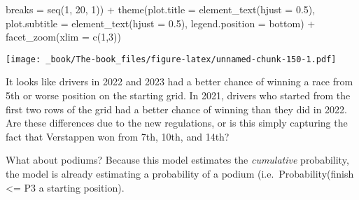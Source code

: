 \documentclass[
]{book}
\newenvironment{Shaded}{\begin{snugshade}}{\end{snugshade}}
\newcommand{\AttributeTok}[1]{\textcolor[rgb]{0.77,0.63,0.00}{#1}}
\newcommand{\DecValTok}[1]{\textcolor[rgb]{0.00,0.00,0.81}{#1}}
\newcommand{\FloatTok}[1]{\textcolor[rgb]{0.00,0.00,0.81}{#1}}
\newcommand{\FunctionTok}[1]{\textcolor[rgb]{0.00,0.00,0.00}{#1}}
\newcommand{\NormalTok}[1]{#1}
\newcommand{\SpecialCharTok}[1]{\textcolor[rgb]{0.00,0.00,0.00}{#1}}
\newcommand{\StringTok}[1]{\textcolor[rgb]{0.31,0.60,0.02}{#1}}
\begin{document}
\begin{Shaded}
\begin{Highlighting}[]
                     \AttributeTok{breaks =} \FunctionTok{seq}\NormalTok{(}\DecValTok{1}\NormalTok{, }\DecValTok{20}\NormalTok{, }\DecValTok{1}\NormalTok{)) }\SpecialCharTok{+}
  \FunctionTok{theme}\NormalTok{(}\AttributeTok{plot.title =} \FunctionTok{element\_text}\NormalTok{(}\AttributeTok{hjust =} \FloatTok{0.5}\NormalTok{),}
        \AttributeTok{plot.subtitle =} \FunctionTok{element\_text}\NormalTok{(}\AttributeTok{hjust =} \FloatTok{0.5}\NormalTok{),}
        \AttributeTok{legend.position =} \StringTok{\textquotesingle{}bottom\textquotesingle{}}\NormalTok{) }\SpecialCharTok{+}
  \FunctionTok{facet\_zoom}\NormalTok{(}\AttributeTok{xlim =} \FunctionTok{c}\NormalTok{(}\DecValTok{1}\NormalTok{,}\DecValTok{3}\NormalTok{))}
\end{Highlighting}
\end{Shaded}

\texttt{[image: \_book/The-book\_files/figure-latex/unnamed-chunk-150-1.pdf]}

It looks like drivers in 2022 and 2023 had a better chance of winning a race from 5th or worse position on the starting grid. In 2021, drivers who started from the first two rows of the grid had a better chance of winning than they did in 2022. Are these differences due to the new regulations, or is this simply capturing the fact that Verstappen won from 7th, 10th, and 14th?

What about podiums? Because this model estimates the \emph{cumulative} probability, the model is already estimating a probability of a podium (i.e.~Probability(finish \textless= P3 \textbar{} a starting position).
\end{document}

